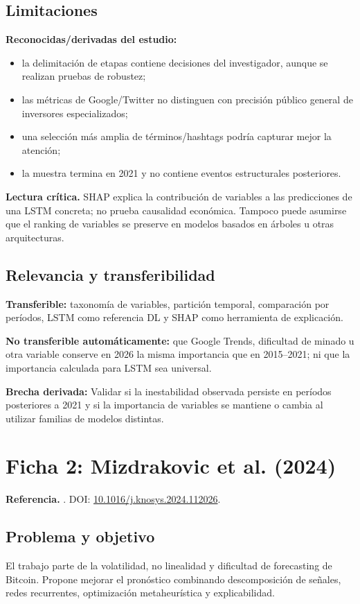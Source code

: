 \documentclass[11pt,letterpaper]{article}
\newcommand{\gapbox}[1]{\par\medskip\noindent\colorbox{gris}{\parbox{0.96\linewidth}{\textbf{Brecha derivada:} #1}}\medskip}
\newcommand{\critica}[1]{\par\smallskip\noindent\textbf{Lectura crítica.} #1}
\begin{document}
\subsection{Limitaciones}
\textbf{Reconocidas/derivadas del estudio:}
\begin{itemize}
  \item la delimitación de etapas contiene decisiones del investigador, aunque se realizan pruebas de robustez;
  \item las métricas de Google/Twitter no distinguen con precisión público general de inversores especializados;
  \item una selección más amplia de términos/hashtags podría capturar mejor la atención;
  \item la muestra termina en 2021 y no contiene eventos estructurales posteriores.
\end{itemize}

\critica{SHAP explica la contribución de variables a las predicciones de una LSTM concreta; no prueba causalidad económica. Tampoco puede asumirse que el ranking de variables se preserve en modelos basados en árboles u otras arquitecturas.}

\subsection{Relevancia y transferibilidad}
\textbf{Transferible:} taxonomía de variables, partición temporal, comparación por períodos, LSTM como referencia DL y SHAP como herramienta de explicación.

\textbf{No transferible automáticamente:} que Google Trends, dificultad de minado u otra variable conserve en 2026 la misma importancia que en 2015--2021; ni que la importancia calculada para LSTM sea universal.

\gapbox{Validar si la inestabilidad observada persiste en períodos posteriores a 2021 y si la importancia de variables se mantiene o cambia al utilizar familias de modelos distintas.}

\section{Ficha 2: Mizdrakovic et al. (2024)}

\textbf{Referencia.} \textcite{mizdrakovic2024}. DOI: \href{https://doi.org/10.1016/j.knosys.2024.112026}{10.1016/j.knosys.2024.112026}.

\subsection{Problema y objetivo}
El trabajo parte de la volatilidad, no linealidad y dificultad de forecasting de Bitcoin. Propone mejorar el pronóstico combinando descomposición de señales, redes recurrentes, optimización metaheurística y explicabilidad.
\end{document}
